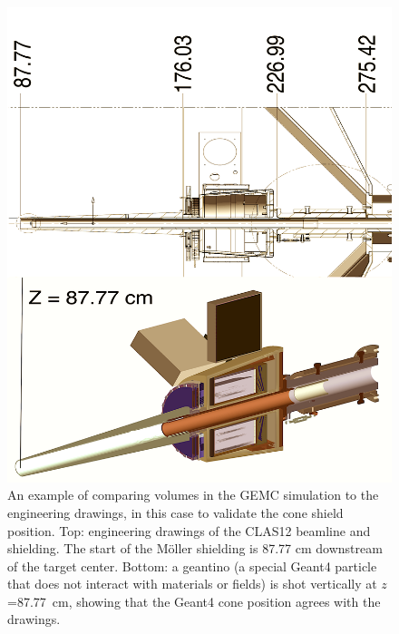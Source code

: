 

\begin{figure}
	\centering
	\includegraphics[width=0.99\columnwidth,keepaspectratio]{img/cadValidationExample.png}
	\caption{An example of comparing volumes in the GEMC simulation to the engineering drawings, in this case to validate the cone shield
             position. Top: engineering drawings of the CLAS12 beamline and shielding. The start of the M\"oller shielding is 87.77 cm downstream
             of the target center. Bottom: a geantino (a special Geant4 particle that does not interact with materials or fields)
             is shot vertically at $z$=87.77~cm, showing that the Geant4 cone position agrees with the drawings.}
	\label{fig:cadValidationExample}
\end{figure}



